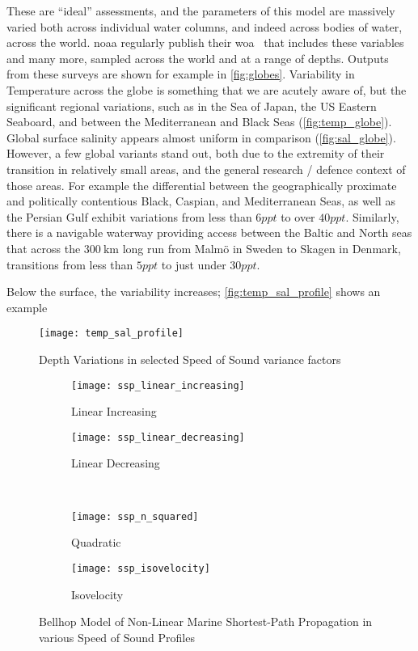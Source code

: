 These are ``ideal'' assessments, and the parameters of this model are massively varied both across individual water columns, and indeed across bodies of water, across the world. 
\gls{noaa} regularly publish their \gls{woa}~\cite{Locarnini2013,Zweng2013} that includes these variables and many more, sampled across the world and at a range of depths. 
Outputs from these surveys are shown for example in \autoref{fig:globes}. 
Variability in Temperature across the globe is something that we are acutely aware of, but the significant regional variations, such as in the Sea of Japan, the US Eastern Seaboard, and between the Mediterranean and Black Seas (\autoref{fig:temp_globe}).
Global surface salinity appears almost uniform in comparison (\autoref{fig:sal_globe}).
However, a few global variants stand out, both due to the extremity of their transition in relatively small areas, and the general research / defence context of those areas. 
For example the differential between the geographically proximate and politically contentious Black, Caspian, and Mediterranean Seas, as well as the Persian Gulf exhibit variations from less than $6ppt$ to over $40ppt$.
Similarly, there is a navigable waterway providing access between the Baltic and North seas that across the $\SI{300}{\kilo\meter}$ long run from Malm{\"o} in Sweden to Skagen in Denmark, transitions from less than $5ppt$ to just under $30ppt$. 

Below the surface, the variability increases; \autoref{fig:temp_sal_profile} shows an example 



\begin{figure}
	\centering
	\texttt{[image: temp\_sal\_profile]}
	\caption{Depth Variations in selected Speed of Sound variance factors}
	\label{fig:temp_sal_profile}
\end{figure}


\begin{figure}
	\begin{subfigure}[t]{0.45\textwidth}
		\centering
		\texttt{[image: ssp\_linear\_increasing]}
		\caption{Linear Increasing}
		\label{fig:ssp_linear_increasing}
	\end{subfigure}
	\begin{subfigure}[t]{0.45\textwidth}
		\centering
		\texttt{[image: ssp\_linear\_decreasing]}
		\caption{Linear Decreasing}
		\label{fig:ssp_linear_decreasing}
	\end{subfigure}\\
	\begin{subfigure}[t]{0.45\textwidth}
		\centering
		\texttt{[image: ssp\_n\_squared]}
		\caption{Quadratic}
		\label{fig:ssp_n_squared}
	\end{subfigure}
	\begin{subfigure}[t]{0.45\textwidth}
		\centering
		\texttt{[image: ssp\_isovelocity]}
		\caption{Isovelocity}
		\label{fig:ssp_isovelocity}
	\end{subfigure}
	\caption{Bellhop Model of Non-Linear Marine Shortest-Path Propagation in various Speed of Sound Profiles}
	\label{fig:ssps}
\end{figure}

